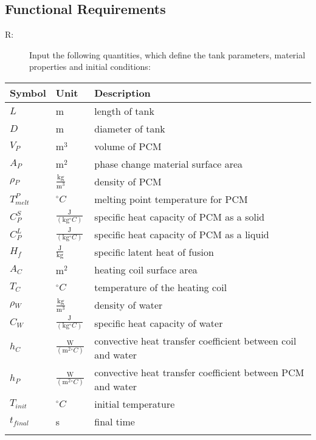 \documentclass[12pt]{article}
\newcounter{reqnum}
\newcommand{\rthereqnum}{R\thereqnum}
\begin{document}
\subsection{Functional Requirements}
\label{Sec:FuncRequ}
\begin{description}
\item[\rthereqnum\label{Rreq1}:]Input the following quantities, which define the tank parameters, material properties and initial conditions:
\end{description}
\begin{longtable*}{l l l}
\toprule
Symbol & Unit & Description
\\
\midrule
$L$ & m & length of tank
\\
$D$ & m & diameter of tank
\\
$V_{P}$ & $\text{m}^{3}$ & volume of PCM
\\
$A_{P}$ & $\text{m}^{2}$ & phase change material surface area
\\
$\rho{}_{P}$ & $\frac{\text{kg}}{\text{m}^{3}}$ & density of PCM
\\
$T_{melt}^{P}$ & ${}^{\circ}C$ & melting point temperature for PCM
\\
$C_{P}^{S}$ & $\frac{\text{J}}{(\text{kg}{}^{\circ}C)}$ & specific heat capacity of PCM as a solid
\\
$C_{P}^{L}$ & $\frac{\text{J}}{(\text{kg}{}^{\circ}C)}$ & specific heat capacity of PCM as a liquid
\\
$H_{f}$ & $\frac{\text{J}}{\text{kg}}$ & specific latent heat of fusion
\\
$A_{C}$ & $\text{m}^{2}$ & heating coil surface area
\\
$T_{C}$ & ${}^{\circ}C$ & temperature of the heating coil
\\
$\rho{}_{W}$ & $\frac{\text{kg}}{\text{m}^{3}}$ & density of water
\\
$C_{W}$ & $\frac{\text{J}}{(\text{kg}{}^{\circ}C)}$ & specific heat capacity of water
\\
$h_{C}$ & $\frac{\text{W}}{(\text{m}^{2}{}^{\circ}C)}$ & convective heat transfer coefficient between coil and water
\\
$h_{P}$ & $\frac{\text{W}}{(\text{m}^{2}{}^{\circ}C)}$ & convective heat transfer coefficient between PCM and water
\\
$T_{init}$ & ${}^{\circ}C$ & initial temperature
\\
$t_{final}$ & s & final time
\\
\bottomrule
\label{Table:InpuVariRequ}
\end{longtable*}
\end{document}
